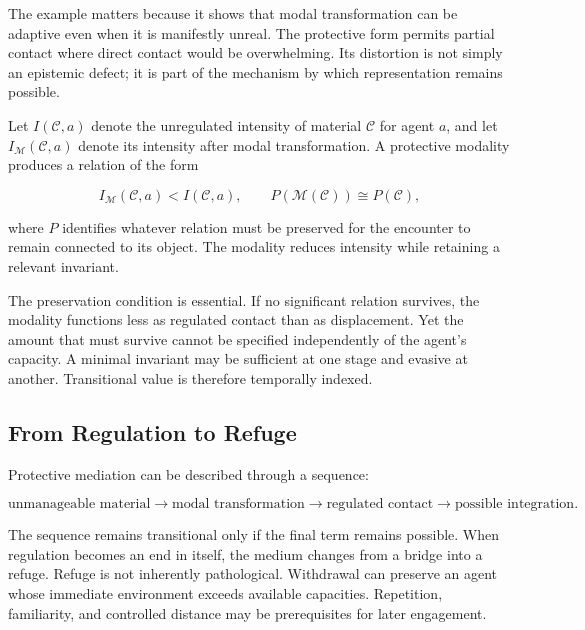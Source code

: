 \documentclass[11pt]{article}
\newcommand{\modality}{\mathcal{M}}
\newcommand{\contentobj}{\mathcal{C}}
\begin{document}
The example matters because it shows that modal transformation can be
adaptive even when it is manifestly unreal. The protective form permits
partial contact where direct contact would be overwhelming. Its distortion is
not simply an epistemic defect; it is part of the mechanism by which
representation remains possible.

Let \(I(\contentobj,a)\) denote the unregulated intensity of material
\(\contentobj\) for agent \(a\), and let
\(I_{\modality}(\contentobj,a)\) denote its intensity after modal
transformation. A protective modality produces a relation of the form

\begin{equation}
  I_{\modality}(\contentobj,a)
  <
  I(\contentobj,a),
  \qquad
  P\!\left(\modality(\contentobj)\right)
  \cong
  P(\contentobj),
  \label{eq:protective-modality}
\end{equation}

where \(P\) identifies whatever relation must be preserved for the encounter
to remain connected to its object. The modality reduces intensity while
retaining a relevant invariant.

The preservation condition is essential. If no significant relation survives,
the modality functions less as regulated contact than as displacement. Yet
the amount that must survive cannot be specified independently of the agent's
capacity. A minimal invariant may be sufficient at one stage and evasive at
another. Transitional value is therefore temporally indexed.

\subsection{From Regulation to Refuge}

Protective mediation can be described through a sequence:

\begin{equation}
  \text{unmanageable material}
  \longrightarrow
  \text{modal transformation}
  \longrightarrow
  \text{regulated contact}
  \longrightarrow
  \text{possible integration}.
  \label{eq:regulated-contact}
\end{equation}

The sequence remains transitional only if the final term remains possible.
When regulation becomes an end in itself, the medium changes from a bridge
into a refuge. Refuge is not inherently pathological. Withdrawal can preserve
an agent whose immediate environment exceeds available capacities. Repetition,
familiarity, and controlled distance may be prerequisites for later
engagement.
\end{document}
